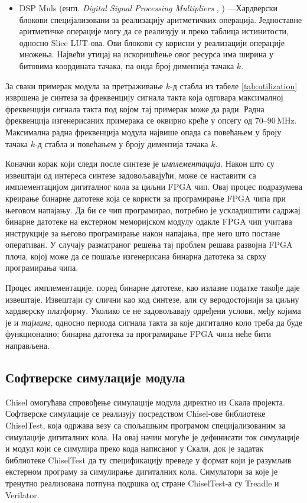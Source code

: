 \documentclass[master]{finthesis}
\makeatletter
\newcommand*{\engl}[2][\@empty]{%
    \edef\theacronym{#1}%
    (енгл. \foreignlanguage{english}{\emph{#2}%
    \ifx\theacronym\@empty \else , #1\fi})%
}
\newcommand*{\kd}{\texorpdfstring{$k$}{k}-д }
\makeatother
\begin{document}
\begin{itemize}
    \item DSP Muls \engl{Digital Signal Processing Multipliers}---Хардверски блокови специјализовани за реализацију аритметичких операција. Једноставне аритметичке операције могу да се реализују и преко таблица истинитости, односно Slice LUT-ова. Ови блокови су корисни у реализацији операције множења. Највећи утицај на искоришћење овог ресурса има ширина у битовима координата тачака, па онда број димензија тачака $k$.
\end{itemize}

За сваки примерак модула за претраживање \kd стабла из табеле \ref{tab:utilization} извршена је синтеза за фреквенцију сигнала такта која одговара максималној фреквенцији сигнала такта под којом тај примерак може да ради. Радна фреквенција изгенерисаних примерака се оквирно креће у опсегу од 70--90\,MHz. Максимална радна фреквенција модула највише опада са повећањем у броју тачака \kd стабла и повећањем у броју димензија тачака $k$.

Коначни корак који следи после синтезе је \emph{имплементација}. Након што су извештаји од интереса синтезе задовољавајући, може се наставити са имплементацијом дигиталног кола за циљни FPGA чип. Овај процес подразумева креирање бинарне датотеке која се користи за програмирање FPGA чипа при његовом напајању. Да би се чип програмирао, потребно је ускладиштити садржај бинарне датотеке на екстерном меморијском модулу одакле FPGA чип учитава инструкције за његово програмирање након напајања, пре него што постане оперативан. У случају разматраног решења тај проблем решава развојна FPGA плоча, којој може да се пошаље изгенерисана бинарна датотека за сврху програмирања чипа.

Процес имплементације, поред бинарне датотеке, као излазне податке такође даје извештаје. Извештаји су слични као код синтезе, али су веродостојнији за циљну хардверску платформу. Уколико се не задовољавају одређени услови, међу којима је и \emph{тајминг}, односно периода сигнала такта за које дигитално коло треба да буде функционално; бинарна датотека за програмирање FPGA чипа неће бити направљена.

\subsection{Софтверске симулације модула}

Chisel омогућава спровођење симулације модула директно из Скала пројекта. Софтверске симулације се реализују посредством Chisel-ове библиотеке ChiselTest, која одржава везу са спољашњим програмом специјализованим за симулације дигиталних кола. На овај начин могуће је дефинисати ток симулације и модул који се симулира преко кода написаног у Скали, док је задатак библиотеке ChiselTest да ту спецификацију преведе у формат који је разумљив екстерном програму за симулирање дигиталних кола. Симулатори за које је тренутно реализована потпуна подршка од стране ChiselTest-а су Treadle и Verilator.
\end{document}
